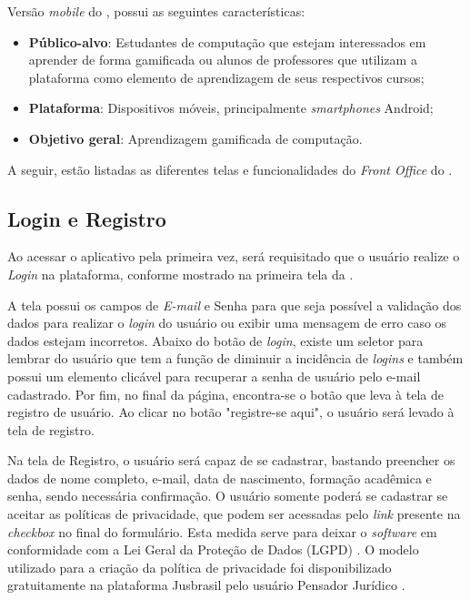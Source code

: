 Versão \textit{mobile} do \appName, possui as seguintes características:

\begin{itemize}
    \item \textbf{Público-alvo}: Estudantes de computação que estejam interessados em aprender de forma gamificada ou alunos de professores que utilizam a plataforma como elemento de aprendizagem de seus respectivos cursos;
    \item \textbf{Plataforma}: Dispositivos móveis, principalmente \textit{smartphones} Android;
    \item \textbf{Objetivo geral}: Aprendizagem gamificada de computação.
\end{itemize}

A seguir, estão listadas as diferentes telas e funcionalidades do \textit{Front Office} do \appName.

\subsection{Login e Registro}

Ao acessar o aplicativo pela primeira vez, será requisitado que o usuário realize o \textit{Login} na plataforma, conforme mostrado na primeira tela da .


A tela possui os campos de \textit{E-mail} e Senha para que seja possível a validação dos dados para realizar o \textit{login} do usuário ou exibir uma mensagem de erro caso os dados estejam incorretos. Abaixo do botão de \textit{login}, existe um seletor para lembrar do usuário que tem a função de diminuir a incidência de \textit{logins} e também possui um elemento clicável para recuperar a senha de usuário pelo e-mail cadastrado. Por fim, no final da página, encontra-se o botão que leva à tela de registro de usuário. Ao clicar no botão "registre-se aqui", o usuário será levado à tela de registro.

Na tela de Registro, o usuário será capaz de se cadastrar, bastando preencher os dados de nome completo, e-mail, data de nascimento, formação acadêmica e senha, sendo necessária confirmação. O usuário somente poderá se cadastrar se aceitar as políticas de privacidade, que podem ser acessadas pelo \textit{link} presente na \textit{checkbox} no final do formulário. Esta medida serve para deixar o \textit{software} em conformidade com a Lei Geral da Proteção de Dados (LGPD) \cite{lgpd}. O modelo utilizado para a criação da política de privacidade foi disponibilizado gratuitamente na plataforma Jusbrasil pelo usuário Pensador Jurídico \cite{politica-privacidade}.

